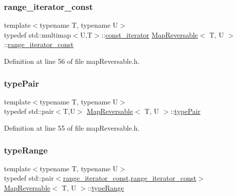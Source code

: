 \subsubsection{\texorpdfstring{range\+\_\+iterator\+\_\+const}{range\_iterator\_const}}
{\footnotesize\ttfamily template$<$typename T, typename U$>$ \\
typedef std\+::multimap$<$U,T$>$\+::\hyperlink{classMapReversable_a7a41e7d60ba284a59e7bf76c8c53e9c2}{const\+\_\+iterator} \hyperlink{classMapReversable}{Map\+Reversable}$<$ T, U $>$\+::\hyperlink{classMapReversable_aed8c3cc9e7a8601664db79d56d117adf}{range\+\_\+iterator\+\_\+const}}



Definition at line 56 of file map\+Reversable.\+h.

\mbox{\label{classMapReversable_a44d0737d4172eafced8eccc56ae06b8f}} 
\subsubsection{\texorpdfstring{type\+Pair}{typePair}}
{\footnotesize\ttfamily template$<$typename T, typename U$>$ \\
typedef std\+::pair$<$T,U$>$ \hyperlink{classMapReversable}{Map\+Reversable}$<$ T, U $>$\+::\hyperlink{classMapReversable_a44d0737d4172eafced8eccc56ae06b8f}{type\+Pair}}



Definition at line 55 of file map\+Reversable.\+h.

\mbox{\label{classMapReversable_a00452d0ddb300578955ed93560508ad0}} 
\subsubsection{\texorpdfstring{type\+Range}{typeRange}}
{\footnotesize\ttfamily template$<$typename T, typename U$>$ \\
typedef std\+::pair$<$\hyperlink{classMapReversable_aed8c3cc9e7a8601664db79d56d117adf}{range\+\_\+iterator\+\_\+const},\hyperlink{classMapReversable_aed8c3cc9e7a8601664db79d56d117adf}{range\+\_\+iterator\+\_\+const}$>$ \hyperlink{classMapReversable}{Map\+Reversable}$<$ T, U $>$\+::\hyperlink{classMapReversable_a00452d0ddb300578955ed93560508ad0}{type\+Range}}



